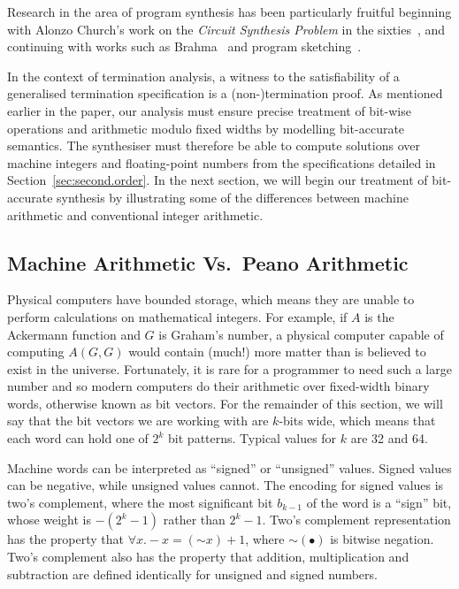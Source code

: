 \documentclass[preprint]{sigplanconf}
\theoremstyle{definition}
\begin{document}
Research in the area of program synthesis has been
particularly fruitful beginning with Alonzo Church's work on the
\emph{Circuit Synthesis Problem} in the sixties~\cite{church-synth}, and
continuing with works such as {\sc Brahma}~\cite{brahma} and program
sketching~\cite{lezama-thesis,sketch,modular-sketch}.

In the context of termination analysis, a witness to the
satisfiability of a generalised termination specification is a
\mbox{(non-)termination} proof.  As mentioned earlier in the paper, our
analysis must ensure precise treatment of bit-wise operations and arithmetic
modulo fixed widths by modelling bit-accurate semantics.  The synthesiser
must therefore be able to compute solutions over machine
integers and floating-point numbers from the specifications detailed in
Section~\ref{sec:second.order}.  In the next section, we will begin our treatment of
bit-accurate synthesis by illustrating some of the differences between
machine arithmetic and conventional integer arithmetic.


\subsection{Machine Arithmetic Vs.~Peano Arithmetic} \label{sec:machine.arith} 

Physical computers have bounded storage, which means they are unable to
perform calculations on mathematical integers.  For example, if $A$ is the
Ackermann function and $G$ is Graham's number, a physical computer capable
of computing $A(G, G)$ would contain (much!) more matter than is believed to
exist in the universe.  Fortunately, it is rare for a programmer to need
such a large number and so modern computers do their arithmetic over
fixed-width binary words, otherwise known as bit vectors.  For the remainder
of this section, we will say that the bit vectors we are working with are
$k$-bits wide, which means that each word can hold one of $2^k$ bit
patterns.  Typical values for $k$ are 32 and 64.

Machine words can be interpreted as ``signed'' or ``unsigned'' values. 
Signed values can be negative, while unsigned values cannot.  The encoding
for signed values is two's complement, where the most significant bit
$b_{k-1}$ of the word is a ``sign'' bit, whose weight is $-(2^k - 1)$ rather
than $2^k - 1$.  Two's complement representation has the property that
$\forall x .  -x = (\mathord{\sim} x) + 1$, where $\mathord{\sim}(\bullet)$
is bitwise negation.  Two's complement also has the property that addition,
multiplication and subtraction are defined identically for unsigned and
signed numbers.
\end{document}

